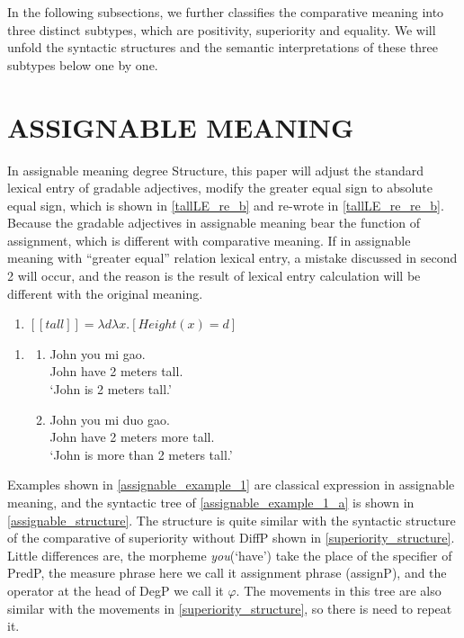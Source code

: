 \documentclass{ctexart}
\begin{document}
In the following subsections, we further classifies the comparative meaning into three distinct subtypes, which are positivity, superiority and equality. We will unfold the syntactic structures and the semantic interpretations of these three subtypes below one by one.

\section{ASSIGNABLE MEANING}

\noindent
In assignable meaning degree Structure, this paper will adjust the standard lexical entry of gradable adjectives, modify the greater equal sign to absolute equal sign, which is shown in \ref{tallLE_re_b} and re-wrote in \ref{tallLE_re_re_b}. Because the gradable adjectives in assignable meaning bear the function of assignment, which is different with comparative meaning. If in assignable meaning with ``greater equal'' relation lexical entry, a mistake discussed in second 2 will occur, and the reason is the result of lexical entry calculation will be different with the original meaning. 

\begin{enumerate}
    \item \label{tallLE_re_re_b}
    $[\![tall]\!]=\lambda d \lambda x.[Height(x) = d]$
\end{enumerate}

\begin{enumerate}
    \item \label{assignable_example_1}
    \begin{enumerate}
        \item \label{assignable_example_1_a}
        John you  mi \enspace \enspace \enspace gao. \\
        John have 2 meters tall. \\
        `John is 2 meters tall.'
        
        \item \label{assignable_example_1_b}
        John you  mi \enspace \enspace duo \enspace gao. \\
        John have 2 meters more tall. \\
        `John is more than 2 meters tall.'
        
    \end{enumerate}
\end{enumerate}

Examples shown in \ref{assignable_example_1} are classical expression in assignable meaning, and the syntactic tree of \ref{assignable_example_1_a} is shown in \ref{assignable_structure}. The structure is quite similar with the syntactic structure of the comparative of superiority without DiffP shown in \ref{superiority_structure}. Little differences are, the morpheme \textit{you}(`have') take the place of the specifier of PredP, the measure phrase here we call it assignment phrase (assignP), and the operator at the head of DegP we call it $\varphi$. The movements in this tree are also similar with the movements in \ref{superiority_structure}, so there is need to repeat it.
\end{document}
